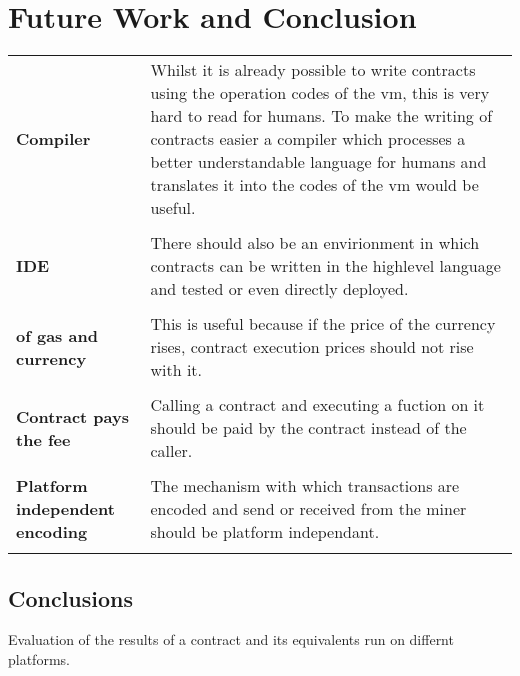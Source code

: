 \chapter{Future Work and Conclusion}

\begin{tabular}[t]{ p{3cm} p{12.5cm}}
\raggedright
\textbf{Compiler} & 
Whilst it is already possible to write contracts using the operation codes of the vm, this is very hard to read for humans. To make the writing of contracts easier a compiler which processes a better understandable language for humans and translates it into the codes of the vm would be useful. \\ \\

\textbf{IDE} & 
There should also be an envirionment in which contracts can be written in the highlevel language and tested or even directly deployed. \\ \\

\raggedright
\textbf{of gas and currency} & 
This is useful because if the price of the currency rises, contract execution prices should not rise with it. \\ \\

\raggedright
\textbf{Contract pays the fee} & 
Calling a contract and executing a fuction on it should be paid by the contract instead of the caller. \\ \\

\raggedright
\textbf{Platform independent encoding} &
The mechanism with which transactions are encoded and send or received from the miner should be platform independant.\\ \\ 
\end{tabular}
\section{Conclusions}
Evaluation of the results of a contract and its equivalents run on differnt platforms.